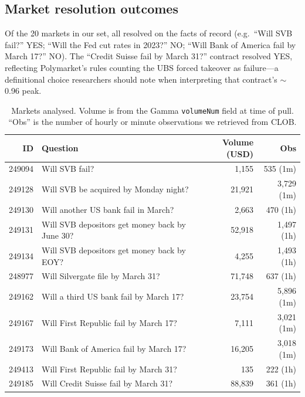 \documentclass{article}
\begin{document}
\subsection{Market resolution outcomes}

Of the 20 markets in our set, all resolved on the facts of record (e.g.\
``Will SVB fail?'' YES; ``Will the Fed cut rates in 2023?'' NO; ``Will
Bank of America fail by March 17?'' NO).  The ``Credit Suisse fail by
March 31?'' contract resolved YES, reflecting Polymarket's rules
counting the UBS forced takeover as failure---a definitional choice
researchers should note when interpreting that contract's
$\sim$0.96 peak.

\begin{table}[tb]
  \centering\small
  \caption{Markets analysed.  Volume is from the Gamma
    \texttt{volumeNum} field at time of pull. ``Obs'' is the number of
    hourly or minute observations we retrieved from CLOB.}
  \label{tab:markets}
  \begin{tabular}{rlrr}
    \toprule
    ID & Question & Volume (USD) & Obs \\
    \midrule
    249094 & Will SVB fail?                                           &    1{,}155 &   535 (1m) \\
    249128 & Will SVB be acquired by Monday night?                    &   21{,}921 & 3{,}729 (1m) \\
    249130 & Will another US bank fail in March?                      &    2{,}663 &   470 (1h) \\
    249131 & Will SVB depositors get money back by June 30?           &   52{,}918 & 1{,}497 (1h) \\
    249134 & Will SVB depositors get money back by EOY?               &    4{,}255 & 1{,}493 (1h) \\
    248977 & Will Silvergate file by March 31?                        &   71{,}748 &   637 (1h) \\
    249162 & Will a third US bank fail by March 17?                   &   23{,}754 & 5{,}896 (1m) \\
    249167 & Will First Republic fail by March 17?                    &    7{,}111 & 3{,}021 (1m) \\
    249173 & Will Bank of America fail by March 17?                   &   16{,}205 & 3{,}018 (1m) \\
    249413 & Will First Republic fail by March 31?                    &      135   &   222 (1h) \\
    249185 & Will Credit Suisse fail by March 31?                     &   88{,}839 &   361 (1h) \\

\end{tabular}
\end{table}
\end{document}
